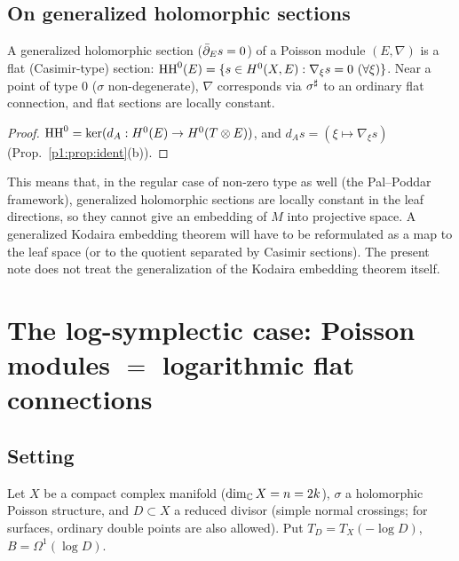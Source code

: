 \subsection{On generalized holomorphic sections}\label{p1:sec:ghfun}
\begin{obs}\tP\label{p1:obs:casimir}
A generalized holomorphic section ($\bar\partial_Es=0$) of a Poisson module $(E,\nabla)$ is a flat (Casimir-type) section: $\HH^0(E)=\{s\in H^0(X,E):\nabla_\xi s=0\ (\forall\xi)\}$. Near a point of type $0$ ($\sigma$ non-degenerate), $\nabla$ corresponds via $\sigma^\sharp$ to an ordinary flat connection, and flat sections are locally constant.
\end{obs}
\begin{proof}
$\mathrm{HH}^0=\ker(d_A:H^0(E)\to H^0(T\otimes E))$, and $d_As=(\xi\mapsto\nabla_\xi s)$ (Prop.~\ref{p1:prop:ident}(b)).
\end{proof}
\begin{rem}\tK
This means that, in the regular case of non-zero type as well (the Pal--Poddar framework), generalized holomorphic sections are locally constant in the leaf directions, so they cannot give an embedding of $M$ into projective space. A generalized Kodaira embedding theorem will have to be reformulated as a map to the leaf space (or to the quotient separated by Casimir sections). The present note does not treat the generalization of the Kodaira embedding theorem itself.
\end{rem}

\section{The log-symplectic case: Poisson modules $=$ logarithmic flat connections}\label{p1:sec:logsymp}
\subsection{Setting}
Let $X$ be a compact complex manifold ($\dim_\mathbb C X=n=2k$), $\sigma$ a holomorphic Poisson structure, and $D\subset X$ a reduced divisor (simple normal crossings; for surfaces, ordinary double points are also allowed).
Put $T_D=T_X(-\log D)$, $B=\Omega^1(\log D)$.

